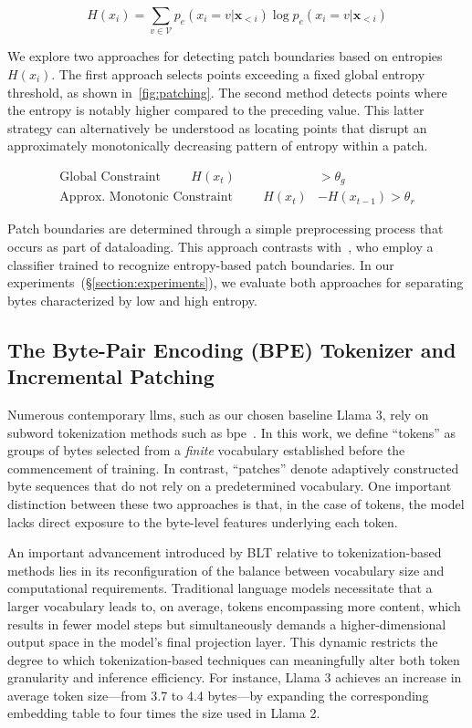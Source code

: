 \begin{equation}
H(x_i) = \sum_{v \in \mathcal{V}} p_{e}(x_i=v|\pmb{x}_{<i}) \log p_{e}(x_i=v|\pmb{x}_{<i})
\end{equation}

We explore two approaches for detecting patch boundaries based on entropies $H(x_i)$. The first approach selects points exceeding a fixed global entropy threshold, as shown in~\autoref{fig:patching}. The second method detects points where the entropy is notably higher compared to the preceding value. This latter strategy can alternatively be understood as locating points that disrupt an approximately monotonically decreasing pattern of entropy within a patch.

\begin{align*}
    \text{Global Constraint}\hspace{1cm}H(x_t)& > \theta_g\\
    \text{Approx. Monotonic Constraint}\hspace{1cm}H(x_t)& - H(x_{t-1}) > \theta_r
\end{align*}

Patch boundaries are determined through a simple preprocessing process that occurs as part of dataloading. This approach contrasts with~\citet{nawrot-etal-2023-efficient}, who employ a classifier trained to recognize entropy-based patch boundaries. In our experiments~(\S\ref{section:experiments}), we evaluate both approaches for separating bytes characterized by low and high entropy.

\subsection{The Byte-Pair Encoding (BPE) Tokenizer and Incremental Patching}
\label{section:incremental-patching}
\label{section:bpe-patch}

Numerous contemporary llms, such as our chosen baseline Llama 3, rely on subword tokenization methods such as bpe~\citep{gage1994new, sennrich-etal-2016-neural}. In this work, we define ``tokens'' as groups of bytes selected from a \textit{finite} vocabulary established before the commencement of training. In contrast, ``patches'' denote adaptively constructed byte sequences that do not rely on a predetermined vocabulary. One important distinction between these two approaches is that, in the case of tokens, the model lacks direct exposure to the byte-level features underlying each token.

An important advancement introduced by {\textsc BLT} relative to tokenization-based methods lies in its reconfiguration of the balance between vocabulary size and computational requirements. Traditional language models necessitate that a larger vocabulary leads to, on average, tokens encompassing more content, which results in fewer model steps but simultaneously demands a higher-dimensional output space in the model’s final projection layer. This dynamic restricts the degree to which tokenization-based techniques can meaningfully alter both token granularity and inference efficiency. For instance, Llama 3 achieves an increase in average token size—from 3.7 to 4.4 bytes—by expanding the corresponding embedding table to four times the size used in Llama 2.


